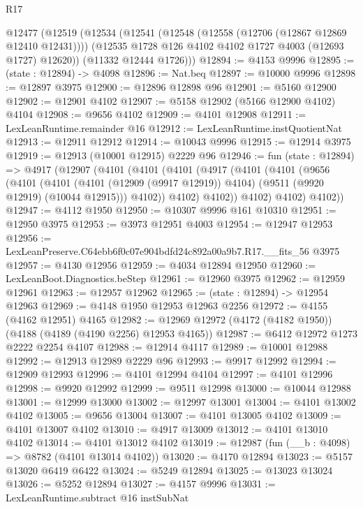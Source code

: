 \begin{lexlean}{R17}
\begin{coremodule}
  @12477
    (@12519
      (@12534
        (@12541
          (@12548 (@12558 (@12706 (@12867 @12869 @12410 @12431))))
          (@12535 @1728 @126 @4102 @4102 @1727 @4003 (@12693 @1727) @12620))
        (@11332 @12444 @1726)))
@12894 := @4153 @9996
@12895 := (state : @12894) -> @4098
@12896 := Nat.beq
@12897 := @10000 @9996
@12898 := @12897 @3975
@12900 := @12896 @12898 @96
@12901 := @5160 @12900
@12902 := @12901 @4102
@12907 := @5158 @12902 (@5166 @12900 @4102) @4104
@12908 := @9656 @4102
@12909 := @4101 @12908
@12911 := LexLeanRuntime.remainder @16
@12912 := LexLeanRuntime.instQuotientNat
@12913 := @12911 @12912
@12914 := @10043 @9996
@12915 := @12914 @3975
@12919 := @12913 (@10001 @12915) @2229 @96
@12946 := fun (state : @12894) =>
  @4917
    (@12907
      (@4101
        (@4101
          (@4101
            (@4917
              (@4101
                (@4101
                  (@9656
                    (@4101
                      (@4101
                        (@4101 (@12909 (@9917 @12919)) @4104)
                        (@9511 (@9920 @12919) (@10044 @12915)))
                      @4102))
                  @4102)
                @4102))
            @4102)
          @4102)
        @4102))
@12947 := @4112 @1950
@12950 := @10307 @9996 @161 @10310
@12951 := @12950 @3975
@12953 := @3973 @12951 @4003
@12954 := @12947 @12953
@12956 := LexLeanPreserve.C64ebb6f0c07e904bdfd24c892a00a9b7.R17.__fits_56 @3975
@12957 := @4130 @12956
@12959 := @4034 @12894 @12950
@12960 := LexLeanBoot.Diagnostics.beStep
@12961 := @12960 @3975
@12962 := @12959 @12961
@12963 := @12957 @12962
@12965 := (state : @12894) -> @12954 @12963
@12969 := @4148 @1950 @12953 @12963 @2256
@12972 := @4155 (@4162 @12951) @4165
@12982 := @12969 @12972 (@4172 (@4182 @1950)) (@4188 (@4189 (@4190 @2256) @12953 @4165))
@12987 := @6412 @12972 @1273 @2222 @2254 @4107
@12988 := @12914 @4117
@12989 := @10001 @12988
@12992 := @12913 @12989 @2229 @96
@12993 := @9917 @12992
@12994 := @12909 @12993
@12996 := @4101 @12994 @4104
@12997 := @4101 @12996
@12998 := @9920 @12992
@12999 := @9511 @12998
@13000 := @10044 @12988
@13001 := @12999 @13000
@13002 := @12997 @13001
@13004 := @4101 @13002 @4102
@13005 := @9656 @13004
@13007 := @4101 @13005 @4102
@13009 := @4101 @13007 @4102
@13010 := @4917 @13009
@13012 := @4101 @13010 @4102
@13014 := @4101 @13012 @4102
@13019 := @12987 (fun (__b : @4098) => @8782 (@4101 @13014 @4102))
@13020 := @4170 @12894
@13023 := @5157 @13020 @6419 @6422
@13024 := @5249 @12894
@13025 := @13023 @13024
@13026 := @5252 @12894
@13027 := @4157 @9996
@13031 := LexLeanRuntime.subtract @16 instSubNat

\end{coremodule}
\end{lexlean}
